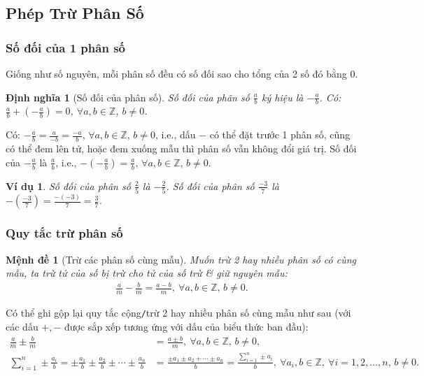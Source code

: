 \documentclass{article}
\newtheorem{dinhnghia}{Định nghĩa}
\newtheorem{menhde}{Mệnh đề}
\newtheorem{vidu}{Ví dụ}
\begin{document}
\subsection{Phép Trừ Phân Số}

\subsubsection{Số đối của 1 phân số}
Giống như số nguyên, mỗi phân số đều có số đối sao cho tổng của 2 số đó bằng 0.

\begin{dinhnghia}[Số đối của phân số]
	\emph{Số đối} của phân số $\frac{a}{b}$ ký hiệu là $-\frac{a}{b}$. Có: $\frac{a}{b} + \left(-\frac{a}{b}\right) = 0$, $\forall a,b\in\mathbb{Z}$, $b\ne0$.
\end{dinhnghia}
Có: $-\frac{a}{b} = \frac{a}{-b} = \frac{-a}{b}$, $\forall a,b\in\mathbb{Z}$, $b\ne0$, i.e., dấu $-$ có thể đặt trước 1 phân số, cũng có thể đem lên tử, hoặc đem xuống mẫu thì phân số vẫn không đổi giá trị. Số đối của $-\frac{a}{b}$ là $\frac{a}{b}$, i.e., $-\left(-\frac{a}{b}\right) = \frac{a}{b}$, $\forall a,b\in\mathbb{Z}$, $b\ne0$.

\begin{vidu}
	Số đối của phân số $\frac{2}{5}$ là $-\frac{2}{5}$. Số đối của phân số $\frac{-3}{7}$ là $-\left(\frac{-3}{7}\right) = \frac{-(-3)}{7} = \frac{3}{7}$.
\end{vidu}

\subsubsection{Quy tắc trừ phân số}

\begin{menhde}[Trừ các phân số cùng mẫu]
	Muốn trừ 2 hay nhiều phân số có cùng mẫu, ta trừ tử của số bị trừ cho tử của số trừ \& giữ nguyên mẫu:
	\begin{align*}
		\frac{a}{m} - \frac{b}{m} = \frac{a - b}{m},\ \forall a,b\in\mathbb{Z},\,b\ne0.
	\end{align*}
\end{menhde}
Có thể ghi gộp lại quy tắc cộng\texttt{/}trừ 2 hay nhiều phân số cùng mẫu như sau (với các dấu $+,-$ được sắp xếp tương ứng với dấu của biểu thức ban đầu):
\begin{align*}
	\frac{a}{m}\pm\frac{b}{m} &= \frac{a\pm b}{m},\ \forall a,b\in\mathbb{Z},\,b\ne0,\\
	\sum_{i=1}^n \pm\frac{a_i}{b} = \pm\frac{a_1}{b}\pm\frac{a_2}{b}\pm\cdots\pm\frac{a_n}{b} &= \frac{\pm a_1\pm a_2 + \cdots\pm a_n}{b} = \frac{\sum_{i=1}^n \pm a_i}{b},\ \forall a_i,b\in\mathbb{Z},\ \forall i = 1,2,\ldots,n,\,b\ne0.
\end{align*}
\end{document}
